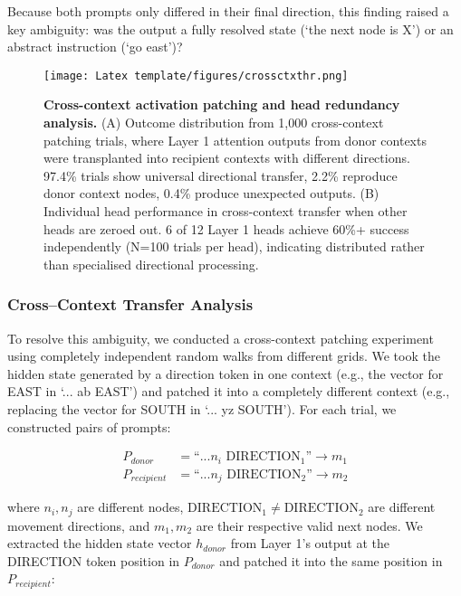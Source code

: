 Because both prompts only differed in their final direction, this finding raised a key ambiguity: was the output a fully resolved state (`the next node is X') or an abstract instruction (`go east')?

\begin{figure}[h]
\centering
\texttt{[image: Latex template/figures/crossctxthr.png]}
\caption[Cross-context activation patching and head redundancy analysis.]{\textbf{Cross-context activation patching and head redundancy analysis.} (A) Outcome distribution from 1,000 cross-context patching trials, where Layer 1 attention outputs from donor contexts were transplanted into recipient contexts with different directions. 97.4\% trials show universal directional transfer, 2.2\% reproduce donor context nodes, 0.4\% produce unexpected outputs. (B) Individual head performance in cross-context transfer when other heads are zeroed out. 6 of 12 Layer 1 heads achieve 60\%+ success independently (N=100 trials per head), indicating distributed rather than specialised directional processing.}
\label{fig:cross_context_head_redundancy}
\end{figure}

\subsubsection{Cross--Context Transfer Analysis}

To resolve this ambiguity, we conducted a cross-context patching experiment using completely independent random walks from different grids. We took the hidden state generated by a direction token in one context (e.g., the vector for EAST in `... ab EAST') and patched it into a completely different context (e.g., replacing the vector for SOUTH in `... yz SOUTH'). For each trial, we constructed pairs of prompts:

\begin{equation}
\begin{split}
    P_{donor} &= \text{``...} n_i \text{ DIRECTION}_1 \text{''} \rightarrow m_1 \\
    P_{recipient} &= \text{``...} n_j \text{ DIRECTION}_2 \text{''} \rightarrow m_2
\end{split}
\end{equation}

where $n_i, n_j$ are different nodes, $\text{DIRECTION}_1 \neq \text{DIRECTION}_2$ are different movement directions, and $m_1, m_2$ are their respective valid next nodes. We extracted the hidden state vector $h_{donor}$ from Layer 1's output at the DIRECTION token position in $P_{donor}$ and patched it into the same position in $P_{recipient}$:

